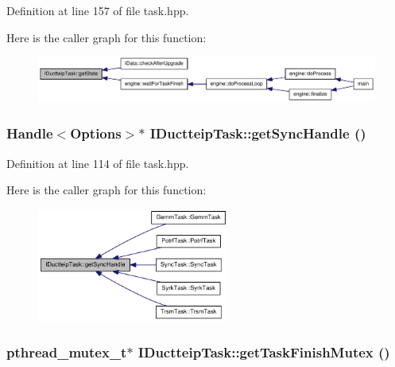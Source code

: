 Definition at line 157 of file task.hpp.

Here is the caller graph for this function:\nopagebreak
\begin{figure}[H]
\begin{center}
\leavevmode
\includegraphics[width=349pt]{class_i_ductteip_task_a7422e06ba861c73d6e00907a4f905aef_icgraph}
\end{center}
\end{figure}
\hypertarget{class_i_ductteip_task_aed04ae7b68a5456ab60617c639da4f45}{
\subsubsection[{getSyncHandle}]{\setlength{\rightskip}{0pt plus 5cm}Handle$<${\bf Options}$>$$\ast$ IDuctteipTask::getSyncHandle ()}}
\label{class_i_ductteip_task_aed04ae7b68a5456ab60617c639da4f45}


Definition at line 114 of file task.hpp.

Here is the caller graph for this function:\nopagebreak
\begin{figure}[H]
\begin{center}
\leavevmode
\includegraphics[width=179pt]{class_i_ductteip_task_aed04ae7b68a5456ab60617c639da4f45_icgraph}
\end{center}
\end{figure}
\hypertarget{class_i_ductteip_task_a1f3ee21dbaeab6688bcc6bda4a9355ca}{
\subsubsection[{getTaskFinishMutex}]{\setlength{\rightskip}{0pt plus 5cm}pthread\_\-mutex\_\-t$\ast$ IDuctteipTask::getTaskFinishMutex ()}}
\label{class_i_ductteip_task_a1f3ee21dbaeab6688bcc6bda4a9355ca}


